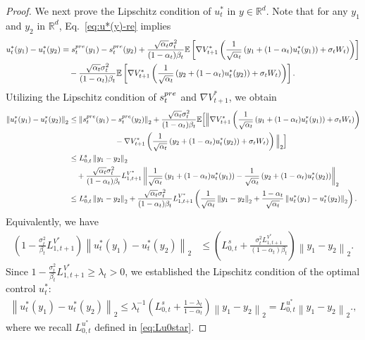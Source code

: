 \documentclass[10pt,a4paper]{amsart}
\newcommand{\R}{\mathbb{R}}
\newcommand{\bracket}[1]{\left[ #1 \right]}
\newcommand{\parenthesis}[1]{\left( #1 \right)}
\newcommand{\norm}[1]{\left \|#1\right \|}
\newcommand{\E}{\mathbb{E}}
\begin{document}
\begin{proof}
We next prove the Lipschitz condition of $u_t^*$ in $y\in \R^d$. Note that for any $y_1$ and $y_2$ in $\R^d$, Eq.~\eqref{eq:u*(y)-re} implies
\begin{align*}
    u_t^*(y_1) - u_t^*(y_2) & = s_{t}^{\rm pre}(y_1) - s_{t}^{\rm pre}(y_2)  + \frac{\sqrt{\alpha_{t}}\sigma_{t}^{2}}{(1 - \alpha_{t})\beta_t}\E\bracket{\nabla V_{t+1}^{*}\parenthesis{\frac{1}{\sqrt{\alpha_t}}\parenthesis{y_1 + (1 - \alpha_t)u_t^*(y_1)} + \sigma_t W_t)}} \\ & \quad - \frac{\sqrt{\alpha_{t}}\sigma_{t}^{2}}{(1 - \alpha_{t})\beta_t}\E\bracket{\nabla V_{t+1}^{*}\parenthesis{\frac{1}{\sqrt{\alpha_t}}\parenthesis{y_2 + (1 - \alpha_t)u_t^*(y_2)} + \sigma_t W_t)}}.
\end{align*}
Utilizing the Lipschitz condition of $s_t^{\rm pre}$ and $\nabla V_{t+1}^{*}$, we obtain
\begin{align*}
    \norm{u_t^*(y_1) - u_t^*(y_2)}_2 & \leq \norm{s_{t}^{\rm pre}(y_1) - s_{t}^{\rm pre}(y_2) }_2  + \frac{\sqrt{\alpha_{t}}\sigma_{t}^{2}}{(1 - \alpha_{t})\beta_t}\E\Big[\Big\|\nabla V_{t+1}^{*}\parenthesis{\frac{1}{\sqrt{\alpha_t}}\parenthesis{y_1 + (1 - \alpha_t)u_t^*(y_1)} + \sigma_t W_t)} \\ & \qquad\qquad\qquad - \nabla V_{t+1}^{*}\parenthesis{\frac{1}{\sqrt{\alpha_t}}\parenthesis{y_2 + (1 - \alpha_t)u_t^*(y_2)} + \sigma_t W_t)}\Big\|_2\Big] \\ & \leq L_{0, t}^s\norm{y_1 - y_2}_2 \\ & \quad + \frac{\sqrt{\alpha_{t}}\sigma_{t}^{2}}{(1 - \alpha_{t})\beta_t}L_{1, t+1}^{V^*}\norm{\frac{1}{\sqrt{\alpha_t}}\parenthesis{y_1 + (1 - \alpha_t)u_t^*(y_1)} - \frac{1}{\sqrt{\alpha_t}}\parenthesis{y_2 + (1 - \alpha_t)u_t^*(y_2)}}_2 \\ & \leq L_{0, t}^s\norm{y_1 - y_2}_2  + \frac{\sqrt{\alpha_{t}}\sigma_{t}^{2}}{(1 - \alpha_{t})\beta_t}L_{1, t+1}^{V^*}\parenthesis{\frac{1}{\sqrt{\alpha_t}}\norm{y_1 - y_2}_2 + \frac{1 - \alpha_t}{\sqrt{\alpha_t}}\norm{u_t^*(y_1) - u_t^*(y_2)}_2}.
\end{align*}
Equivalently, we have 
\begin{align*}
      \parenthesis{1 - \frac{\sigma_t^2}{\beta_t}L^{V^*}_{1, t+1}}\norm{u_t^*(y_1) - u_t^*(y_2)}_2  & \leq \parenthesis{L_{0, t}^s + \frac{\sigma_t^2 L^{V^*}_{1, t+1}}{(1- \alpha_t)\beta_t}}\norm{y_1 - y_2}_2.
\end{align*}
Since $1 - \frac{\sigma_t^2}{\beta_t}L^{V^*}_{1, t+1}\geq \lambda_t > 0$, we established the Lipschitz condition of the optimal control $u_t^*$:
\begin{align*}
    \norm{u_t^*(y_1) - u_t^*(y_2)}_2 \leq \lambda_{t}^{-1}\parenthesis{L_{0, t}^s + \frac{1 - \lambda_t}{1- \alpha_t}}\norm{y_1 - y_2}_2 = L_{0, t}^{u^*}\norm{y_1 - y_2}_2.,
\end{align*}
where we recall $L_{0, t}^{u^*}$ defined in \eqref{eq:Lu0star}.


\end{proof}
\end{document}
